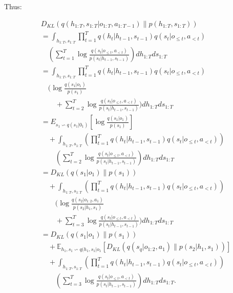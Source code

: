 Thus:

\begin{footnotesize} 
	\begin{equation} \label{6}
	\begin{aligned}
	&D_{KL}(q(h_{1:T},s_{1:T}|o_{1:T},a_{1:T-1})\parallel p(h_{1:T},s_{1:T}))\\
	&= \int_{{h_{1:T},s_{1:T}}}\displaystyle\prod_{t=1}^{T}q(h_{t}|h_{t-1},s_{t-1})q(s_t|o_{\leq t},a_{<t})\\ 
	&\quad (\displaystyle\sum_{t=1}^{T}\log \frac{q(s_t|o_{\leq t},a_{<t})}{p(s_t|h_{t-1},s_{t-1})}) d h_{1:T} d s_{1:T} \\
	&=\int_{{h_{1:T},s_{1:T}}}\displaystyle\prod_{t=1}^{T}q(h_{t}|h_{t-1},s_{t-1})q(s_t|o_{\leq t},a_{<t}) \\ 
	&\quad (\log \frac{q(s_1|o_1)}{p(s_1)} \\
	&\qquad+ \displaystyle\sum_{t=2}^{T}\log \frac{q(s_t|o_{\leq t},a_{<t})}{p(s_t|h_{t-1},s_{t-1})}) d h_{1:T} d s_{1:T} \\
	&= E_{s_1\backsim q(s_1|0_1)}[\log \frac{q(s_1|o_1)}{p(s_1)}]\\
	&\quad +\int_{{h_{1:T},s_{1:T}}}
	(\displaystyle\prod_{t=1}^{T}q(h_{t}|h_{t-1},s_{t-1})q(s_t|o_{\leq t},a_{<t})) \\
	&\qquad ( \displaystyle\sum_{t=2}^{T}\log \frac{q(s_t|o_{\leq t},a_{<t})}{p(s_t|h_{t-1},s_{t-1})}) d h_{1:T} d s_{1:T} \\
	&=D_{KL}(q(s_1|o_1)\parallel p(s_1))\\
	&\quad +\int_{{h_{1:T},s_{1:T}}}
	(\displaystyle\prod_{t=1}^{T}q(h_{t}|h_{t-1},s_{t-1})q(s_t|o_{\leq t},a_{<t})) \\
	&\qquad ( \log \frac{q(s_2|o_{1:2},a_1)}{p(s_2|h_1,s_1)} \\ &\qquad +\displaystyle\sum_{t=3}^{T}\log \frac{q(s_t|o_{\leq t},a_{<t})}{p(s_t|h_{t-1},s_{t-1})}) d h_{1:T} d s_{1:T} \\
	&= D_{KL}(q(s_1|o_1)\parallel p(s_1))\\ 
	&\quad +\mathbb{E}_{h_1,s_1\backsim q(h_1,s_1|o_1}[D_{KL}(q(s_q|o_{1:2},a_1)\parallel p(s_2|h_1,s_1))] \\
	&\quad +\int_{{h_{1:T},s_{1:T}}}
	(\displaystyle\prod_{t=1}^{T}q(h_{t}|h_{t-1},s_{t-1})q(s_t|o_{\leq t},a_{<t})) \\
	&\qquad ( \displaystyle\sum_{t=3}^{T}\log \frac{q(s_t|o_{\leq t},a_{<t})}{p(s_t|h_{t-1},s_{t-1})}) d h_{1:T} d s_{1:T}.
	\end{aligned}
	\end{equation} 
\end{footnotesize}

